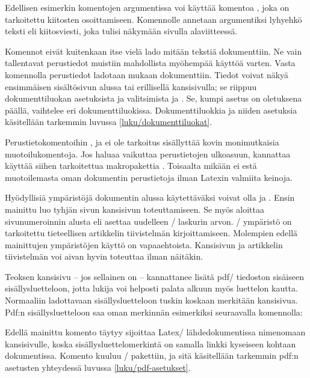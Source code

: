 Edellisen esimerkin komentojen argumentissa voi käyttää komentoa
, joka on tarkoitettu kiitosten osoittamiseen.
Komennolle annetaan argumentiksi lyhyehkö teksti eli kiitosviesti, joka
tulisi näkymään sivulla alaviitteessä.

Komennot eivät kuitenkaan itse vielä lado mitään tekstiä dokumenttiin.
Ne vain tallentavat perustiedot muistiin mahdollista myöhempää käyttöä
varten. Vasta komennolla  perustiedot ladotaan
mukaan dokumenttiin. Tiedot voivat näkyä ensimmäisen sisältösivun alussa
tai erillisellä kansisivulla; se riippuu dokumenttiluokan asetuksista ja
valitsimista  ja . Se, kumpi asetus
on oletuksena päällä, vaihtelee eri dokumenttiluokissa.
Dokumenttiluokkia ja niiden asetuksia käsitellään tarkemmin luvussa
\ref{luku/dokumenttiluokat}.

Perustietokomentoihin ,  ja
 ei ole tarkoitus sisällyttää kovin monimutkaisia
muotoilukomentoja. Jos haluaa vaikuttaa perustietojen ulkoasuun,
kannattaa käyttää siihen tarkoitettua makropakettia
. Toisaalta mikään ei estä
muotoilemasta oman dokumentin perustietoja ilman Latexin valmiita
keinoja.

Hyödyllisiä ympäristöjä dokumentin alussa käytettäväksi voivat olla
 ja . Ensin mainittu luo
tyhjän sivun kansisivun toteuttamiseen. Se myös aloittaa sivunumeroinnin
alusta eli asettaa uudelleen \-/ laskurin arvon.
\-/ ympäristö on tarkoitettu tieteellisen artikkelin
tiivistelmän kirjoittamiseen. Molempien edellä mainittujen ympäristöjen
käyttö on vapaaehtoista. Kansisivun ja artikkelin tiivistelmän voi aivan
hyvin toteuttaa ilman näitäkin.

Teoksen kansisivu -- jos sellainen on -- kannattanee lisätä pdf\-/
tiedoston sisäiseen sisällysluetteloon, jotta lukija voi helposti palata
alkuun myös luettelon kautta. Normaaliin ladottavaan sisällysluetteloon
tuskin koskaan merkitään kansisivua. Pdf:n sisällysluetteloon saa oman
merkinnän esimerkiksi seuraavalla komennolla:

\begin{koodilohkosis}
\end{koodilohkosis}

Edellä mainittu komento  täytyy sijoittaa Latex\-/
lähdedokumentissa nimenomaan kansisivulle, koska
sisällysluettelomerkintä on samalla linkki kyseiseen kohtaan
dokumentissa. Komento kuuluu \-/ pakettiin, ja sitä
käsitellään tarkemmin pdf:n asetusten yhteydessä luvussa
\ref{luku/pdf-asetukset}.

